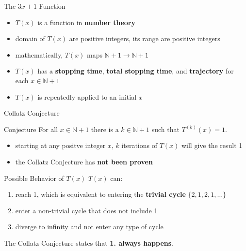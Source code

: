 \documentclass[hyperref={colorlinks,allcolors=black}]{beamer}
\begin{document}
\begin{frame}{The $3x+1$ Function}
\begin{itemize}
    \item $T(x)$ is a function in \textbf{number theory}
    \item domain of $T(x)$ are positive integers, its range are positive 
        integers
    \item mathematically, 
        $T(x)$ maps $\mathbb{N} + 1 \rightarrow \mathbb{N} + 1$ 
    \item $T(x)$ has a \textbf{stopping time}, \textbf{total stopping 
        time}, and \textbf{trajectory} for each $x \in \mathbb{N} + 1$
    \item $T(x)$ is repeatedly applied to an initial $x$
\end{itemize}
\end{frame}


\begin{frame}{Collatz Conjecture}
\begin{block}{Conjecture}
For all $x \in \mathbb{N} + 1$ there is a $k \in \mathbb{N} + 1$ such that
$T^{(k)}(x)=1$.
\end{block}

\begin{itemize}
    \item starting at any positve integer $x$, $k$ iterations of $T(x)$ will 
        give the result 1
    \item the Collatz Conjecture has \textbf{not been proven}
\end{itemize}
\end{frame}


\begin{frame}{Possible Behavior of $T(x)$}
$T(x)$ can:
\begin{enumerate}
    \item reach 1, which is equivalent to entering the \textbf{trivial cycle} 
        $\{2,1,2,1,\dots\}$
    \item enter a non-trivial cycle that does not include 1
    \item diverge to infinity and not enter any type of cycle
\end{enumerate}
    The Collatz Conjecture states that \textbf{1. always happens}.
\end{frame}
\end{document}

